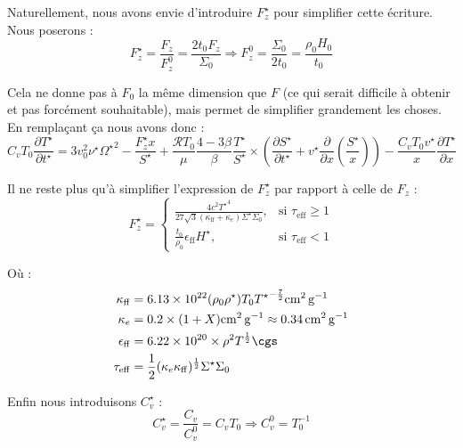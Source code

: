 Naturellement, nous avons envie d’introduire $F_z^\star$ pour simplifier cette
écriture. Nous poserons :
\begin{equation}
    F_z^\star = \frac{F_z}{F_z^0} = \frac{2 t_0 F_z}{\Sigma_0} \Rightarrow F_z^0 = \frac{\Sigma_0}{2 t_0} = \frac{\rho_0 H_0}{t_0}
\end{equation}

Cela ne donne pas à $F_0$ la même dimension que $F$ (ce qui serait difficile à
obtenir et pas forcément souhaitable), mais permet de simplifier grandement les
choses. En remplaçant ça nous avons donc :
\begin{equation}
    C_v T_0 \frac{\partial T^{\star}}{\partial t^{\star}} =
    3 v_0^2 \nu^\star {\Omega^\star}^2 - \frac{F_z^\star x}{S^\star} +
    \frac{\mathcal{R} T_0}{\mu} \frac{4-3\beta}{\beta} \frac{T^\star}{S^\star} \times
    \left( \frac{\partial S^\star}{\partial t^\star} + v^\star \frac{\partial}{\partial x} \left(\frac{S^\star}{x}\right) \right) -
    \frac{C_v T_0 v^\star}{x} \frac{\partial T^\star}{\partial x}
\end{equation}

Il ne reste plus qu’à simplifier l’expression de $F_z^\star$ par rapport à
celle de $F_z$ :
\begin{equation}
    F_z^\star =
    \begin{cases}
        \frac{4 c^2 {T^\star}^4}{27 \sqrt{3} (\kappa_\mathrm{ff} + \kappa_e)\Sigma^\star \Sigma_0}, &\text{si $\tau_\mathrm{eff} \geq 1$} \\
        \frac{t_0}{\rho_0}\epsilon_\mathrm{ff} H^\star, &\text{si $\tau_\mathrm{eff} < 1$}
    \end{cases}
\end{equation}

Où :
\begin{align}
    \kappa_\mathrm{ff} &= \num{6.13e22} (\rho_0 \rho^\star) {T_0 T^\star}^{-\frac{7}{2}} \si{\square\centi\meter\per\gram} \\
    \kappa_e &= 0.2 \times (1 + X) \si{\square\centi\meter\per\gram} \approx \SI{0.34}{\square\centi\meter\per\gram} \\
    \epsilon_\mathrm{ff} &= \num{6.22e20} \times \rho^2 T^\frac{1}{2} \si{\cgs} \\
    \tau_\mathrm{eff} &= \frac{1}{2} (\kappa_e \kappa_\mathrm{ff})^\frac{1}{2} \Sigma^\star \Sigma_0 \\
\end{align}

Enfin nous introduisons $C_v^\star$ :
\begin{equation}
    C_v^\star = \frac{C_v}{C_v^0} = C_v T_0 \Rightarrow C_v^0 = T_0^{-1}
\end{equation} 

